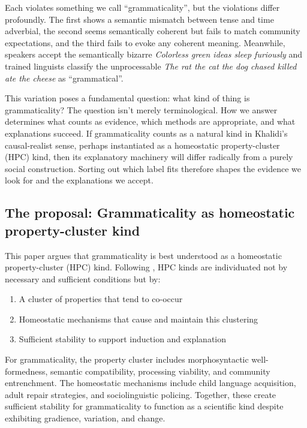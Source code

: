 \documentclass[12pt]{article}
\begin{document}
\ea
{}
\z
\z
Each violates something we call \enquote{grammaticality}, but the violations differ profoundly. The first shows a semantic mismatch between tense and time adverbial, the second seems semantically coherent but fails to match community expectations, and the third fails to evoke any coherent meaning. Meanwhile, speakers accept the semantically bizarre \textit{Colorless green ideas sleep furiously} and trained linguists classify the unprocessable \textit{The rat the cat the dog chased killed ate the cheese} as \enquote{grammatical}.

This variation poses a fundamental question: what kind of thing is grammaticality? The question isn't merely terminological. How we answer determines what counts as evidence, which methods are appropriate, and what explanations succeed. If grammaticality counts as a natural kind in Khalidi's causal-realist sense, perhaps instantiated as a homeostatic property-cluster (HPC) kind, then its explanatory machinery will differ radically from a purely social construction. Sorting out which label fits therefore shapes the evidence we look for and the explanations we accept.

\subsection{The proposal: Grammaticality as homeostatic property-cluster kind}

This paper argues that grammaticality is best understood as a homeostatic property-cluster (HPC) kind. Following \textcite{boyd1991realism}, HPC kinds are individuated not by necessary and sufficient conditions but by:

\begin{enumerate}
\item A cluster of properties that tend to co-occur
\item Homeostatic mechanisms that cause and maintain this clustering
\item Sufficient stability to support induction and explanation
\end{enumerate}

For grammaticality, the property cluster includes morphosyntactic well-formedness, semantic compatibility, processing viability, and community entrenchment. The homeostatic mechanisms include child language acquisition, adult repair strategies, and sociolinguistic policing. Together, these create sufficient stability for grammaticality to function as a scientific kind despite exhibiting gradience, variation, and change.
\end{document}
